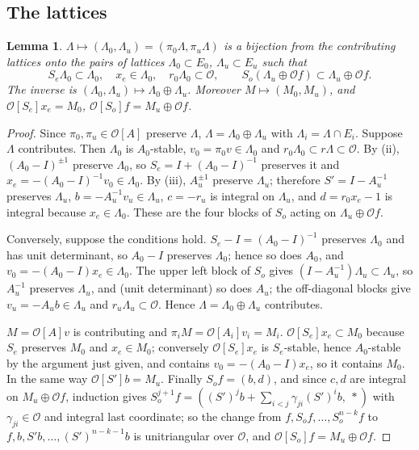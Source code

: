 \documentclass[11pt,oneside,notitlepage]{book}
\numberwithin{equation}{section}
\theoremstyle{plain}
\newtheorem{lemma}[theorem]{Lemma}
\theoremstyle{definition}
\newcommand{\cO}{\mathcal{O}}
\begin{document}
\subsection*{The lattices}

\begin{lemma}\label{lem:Lsplit}
$\Lambda\mapsto(\Lambda_0,\Lambda_u)=(\pi_0\Lambda,\pi_u\Lambda)$ is a bijection from the contributing lattices onto the pairs of lattices $\Lambda_0\subset E_0$, $\Lambda_u\subset E_u$ such that
\[S_e\Lambda_0\subset\Lambda_0,\quad x_e\in\Lambda_0,\quad r_0\Lambda_0\subset\cO,\qquad S_o(\Lambda_u\oplus\cO f)\subset\Lambda_u\oplus\cO f .\]
The inverse is $(\Lambda_0,\Lambda_u)\mapsto\Lambda_0\oplus\Lambda_u$. Moreover $M\mapsto(M_0,M_u)$, and $\cO[S_e]x_e=M_0$, $\cO[S_o]f=M_u\oplus\cO f$.
\end{lemma}
\begin{proof}
Since $\pi_0,\pi_u\in\cO[A]$ preserve $\Lambda$, $\Lambda=\Lambda_0\oplus\Lambda_u$ with $\Lambda_i=\Lambda\cap E_i$. Suppose $\Lambda$ contributes. Then $\Lambda_0$ is $A_0$-stable, $v_0=\pi_0v\in\Lambda_0$ and $r_0\Lambda_0\subset r\Lambda\subset\cO$. By (ii), $(A_0-I)^{\pm1}$ preserve $\Lambda_0$, so $S_e=I+(A_0-I)^{-1}$ preserves it and $x_e=-(A_0-I)^{-1}v_0\in\Lambda_0$. By (iii), $A_u^{\pm1}$ preserve $\Lambda_u$; therefore $S'=I-A_u^{-1}$ preserves $\Lambda_u$, $b=-A_u^{-1}v_u\in\Lambda_u$, $c=-r_u$ is integral on $\Lambda_u$, and $d=r_0x_e-1$ is integral because $x_e\in\Lambda_0$. These are the four blocks of $S_o$ acting on $\Lambda_u\oplus\cO f$.

Conversely, suppose the conditions hold. $S_e-I=(A_0-I)^{-1}$ preserves $\Lambda_0$ and has unit determinant, so $A_0-I$ preserves $\Lambda_0$; hence so does $A_0$, and $v_0=-(A_0-I)x_e\in\Lambda_0$. The upper left block of $S_o$ gives $(I-A_u^{-1})\Lambda_u\subset\Lambda_u$, so $A_u^{-1}$ preserves $\Lambda_u$, and (unit determinant) so does $A_u$; the off-diagonal blocks give $v_u=-A_ub\in\Lambda_u$ and $r_u\Lambda_u\subset\cO$. Hence $\Lambda=\Lambda_0\oplus\Lambda_u$ contributes.

$M=\cO[A]v$ is contributing and $\pi_iM=\cO[A_i]v_i=M_i$. $\cO[S_e]x_e\subset M_0$ because $S_e$ preserves $M_0$ and $x_e\in M_0$; conversely $\cO[S_e]x_e$ is $S_e$-stable, hence $A_0$-stable by the argument just given, and contains $v_0=-(A_0-I)x_e$, so it contains $M_0$. In the same way $\cO[S']b=M_u$. Finally $S_of=(b,d)$, and since $c,d$ are integral on $M_u\oplus\cO f$, induction gives $S_o^{j+1}f=((S')^jb+\sum_{i<j}\gamma_{ji}(S')^ib,\ *)$ with $\gamma_{ji}\in\cO$ and integral last coordinate; so the change from $f,S_of,\dots,S_o^{n-k}f$ to $f,b,S'b,\dots,(S')^{n-k-1}b$ is unitriangular over $\cO$, and $\cO[S_o]f=M_u\oplus\cO f$.
\end{proof}
\end{document}
